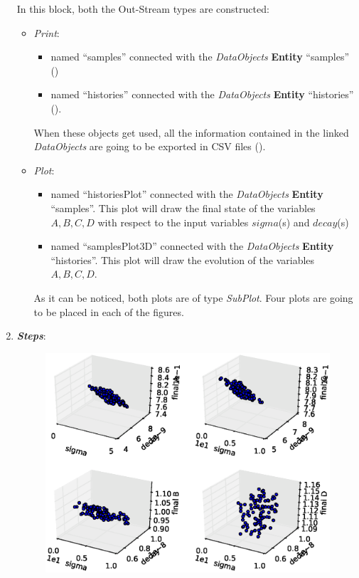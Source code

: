 \begin{enumerate}
\begin{figure}[h!]
 \end{figure}
  In this block, both the Out-Stream types are constructed:
  \begin{itemize}
    \item \textit{Print}:
     \begin{itemize}
       \item named ``samples'' connected with the \textit{DataObjects} \textbf{Entity} ``samples''
                ()
       \item named ``histories'' connected with the \textit{DataObjects} \textbf{Entity} ``histories'' ().
     \end{itemize}
      When these objects get used, all the information contained in the
      linked  \textit{DataObjects} are going
    to be exported in CSV files ().
    \item \textit{Plot}:
    \begin{itemize}
      \item named ``historiesPlot'' connected with the  \textit{DataObjects}
      \textbf{Entity} ``samples''.  This plot will draw the final state of the
      variables $A,B,C,D$ with respect to the input variables $sigma$(s)
      and $decay$(s)
      \item named ``samplesPlot3D'' connected with the
      \textit{DataObjects} \textbf{Entity} ``histories''. This plot will draw the
      evolution of the variables $A,B,C,D$.
    \end{itemize}
     As it can be noticed, both plots are of type \textit{SubPlot}. Four plots
     are going to be placed in each of the figures.
  \end{itemize}
   \item \textbf{\textit{Steps}}:
 \begin{figure}[h!]
  \centering
  \includegraphics[scale=0.7]{../../tests/framework/user_guide/ForwardSamplingStrategies/gold/RunDir/Stratified/1-samplesPlot3D_scatter-scatter-scatter-scatter.eps}

\end{figure}
\end{enumerate}
